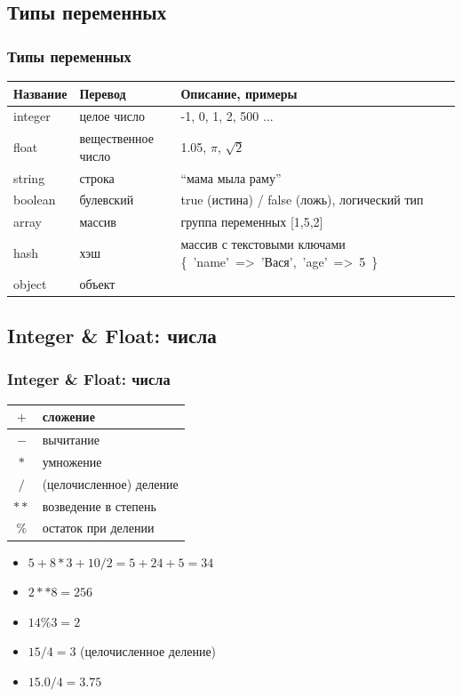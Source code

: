 \documentclass[compress,red]{beamer}
\begin{document}
\subsection{Типы переменных}
\begin{frame}
  \frametitle{Типы переменных}
  
  \begin{tabular}{|p{2cm}|p{2.5cm}|p{5.5cm}|}
  \hline
  Название & Перевод & Описание, примеры \\
  \hline
  integer & целое число & -1, 0, 1, 2, 500 ... \\
  \hline
  float & вещественное число & 1.05, $\pi$, $\sqrt{2}$ \\
  \hline
  string & строка & ``мама мыла раму'' \\
  \hline
  boolean & булевский & true (истина) / false (ложь), логический тип \\
  \hline
  array & массив & группа переменных [1,5,2] \\
  \hline
  hash & хэш & массив с текстовыми ключами \{~'name'~=>~'Вася',~'age'~=>~5~\} \\
  \hline
  object & объект &  \\
  \hline
  \end{tabular}
  
\end{frame}

\subsection{Integer \& Float: числа}
\begin{frame}
  \frametitle{Integer \& Float: числа}
	\begin{tabular}{|c|l|}
	\hline
	$+$ & сложение\\
	\hline
	$-$ & вычитание\\
	\hline
	$*$ & умножение\\
	\hline
	$/$ & (целочисленное) деление \\
	\hline
	$**$ & возведение в степень \\
	\hline
	$\%$ & остаток при делении\\
	\hline
	\end{tabular}
	
  \begin{itemize}
	\item $5 + 8*3 + 10 / 2 = 5 + 24 + 5 = 34 $
	\item $2**8 = 256$
	\item $14\%3 = 2$
	\item $15 / 4 = 3$ (целочисленное деление)
	\item $15.0 / 4 = 3.75$
	\end{itemize}
\end{frame}
\end{document}

